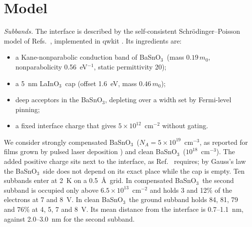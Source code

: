 \documentclass[11pt]{article}
\newcommand{\LIO}{\texorpdfstring{LaInO$_3$}{LaInO3}}
\newcommand{\BSO}{\texorpdfstring{BaSnO$_3$}{BaSnO3}}
\begin{document}
\section{Model}\label{sec:model}
\emph{Subbands.} The interface is described by the self-consistent Schr\"odinger--Poisson model of Refs.~\cite{OwnbyMAT01,OwnbyMAT02}, implemented in qwkit \cite{qwkit}. Its ingredients are:
\begin{itemize}
\item a Kane-nonparabolic conduction band of \BSO\ (mass $0.19\,m_0$, nonparabolicity 0.56~eV$^{-1}$, static permittivity 20);
\item a 5~nm \LIO\ cap (offset 1.6~eV, mass $0.46\,m_0$);
\item deep acceptors in the \BSO, depleting over a width set by Fermi-level pinning;
\item a fixed interface charge that gives $5\times10^{12}$~cm$^{-2}$ without gating.
\end{itemize}
We consider strongly compensated \BSO\ ($N_A=5\times10^{19}$~cm$^{-3}$, as reported for films grown by pulsed laser deposition \cite{Kim2019LIO}) and clean \BSO\ ($10^{18}$~cm$^{-3}$). The added positive charge sits next to the interface, as Ref.~\cite{OwnbyMAT02} requires; by Gauss's law the \BSO\ side does not depend on its exact place while the cap is empty. Ten subbands enter at 2~K on a 0.5~\AA\ grid. In compensated \BSO\ the second subband is occupied only above $6.5\times10^{13}$~cm$^{-2}$ and holds 3 and 12\% of the electrons at 7 and 8~V. In clean \BSO\ the ground subband holds 84, 81, 79 and 76\% at 4, 5, 7 and 8~V. Its mean distance from the interface is 0.7--1.1~nm, against 2.0--3.0~nm for the second subband.
\end{document}
